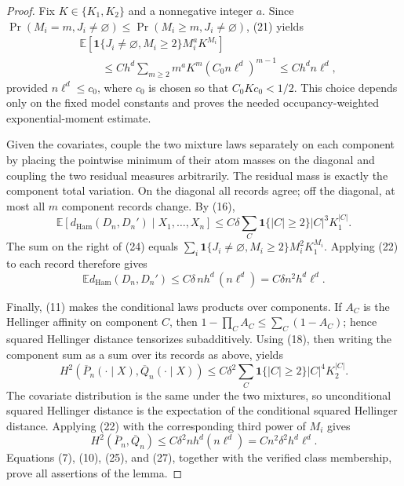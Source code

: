 \documentclass{article}
\begin{document}
\begin{proof}
Fix \(K\in\{K_1,K_2\}\) and a nonnegative integer \(a\).  Since \(\Pr(M_i=m,J_i\ne\varnothing)\le\Pr(M_i\ge m,J_i\ne\varnothing)\), (21) yields
\[
\begin{split}
 &\mathbb E\!\left[
 \mathbf 1\{J_i\ne\varnothing,M_i\ge2\}M_i^aK^{M_i}
 \right]\\
 &\qquad\le Ch^d\sum_{m\ge2}m^aK^m(C_0n\ell^d)^{m-1}
 \le Ch^d n\ell^d,
\end{split}
 \tag{22}
\]
provided \(n\ell^d\le c_0\), where \(c_0\) is chosen so that \(C_0Kc_0<1/2\).  This choice depends only on the fixed model constants and proves the needed occupancy-weighted exponential-moment estimate.

Given the covariates, couple the two mixture laws separately on each component by placing the pointwise minimum of their atom masses on the diagonal and coupling the two residual measures arbitrarily.  The residual mass is exactly the component total variation.  On the diagonal all records agree; off the diagonal, at most all \(m\) component records change.  By (16),
\[
 \mathbb E[d_{\mathrm{Ham}}(D_n,D_n')\mid X_1,\ldots,X_n]
 \le C\delta\sum_C\mathbf 1\{|C|\ge2\}|C|^3K_1^{|C|}.
 \tag{24}
\]
The sum on the right of (24) equals
\(\sum_i\mathbf 1\{J_i\ne\varnothing,M_i\ge2\}M_i^2K_1^{M_i}\).  Applying (22) to each record therefore gives
\[
 \mathbb E d_{\mathrm{Ham}}(D_n,D_n')
 \le C\delta\,n h^d\,(n\ell^d)
 =C\delta n^2h^d\ell^d.
 \tag{25}
\]

Finally, (11) makes the conditional laws products over components.  If \(A_C\) is the Hellinger affinity on component \(C\), then
\(1-\prod_CA_C\le\sum_C(1-A_C)\); hence squared Hellinger distance tensorizes subadditively.  Using (18), then writing the component sum as a sum over its records as above, yields
\[
 H^2(\overline P_n(\cdot\mid X),\overline Q_n(\cdot\mid X))
 \le C\delta^2\sum_C\mathbf 1\{|C|\ge2\}|C|^4K_2^{|C|}.
 \tag{26}
\]
The covariate distribution is the same under the two mixtures, so unconditional squared Hellinger distance is the expectation of the conditional squared Hellinger distance.  Applying (22) with the corresponding third power of \(M_i\) gives
\[
 H^2(\overline P_n,\overline Q_n)
 \le C\delta^2 n h^d(n\ell^d)
 =C n^2\delta^2h^d\ell^d.
 \tag{27}
\]
Equations (7), (10), (25), and (27), together with the verified class membership, prove all assertions of the lemma.
\end{proof}
\end{document}
